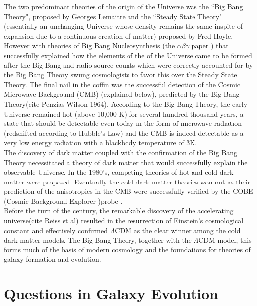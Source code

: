 The two predominant theories of the origin of the Universe was the ``Big Bang Theory", proposed by Georges Lemaitre and the ``Steady State Theory"(essentially an unchanging Universe whose density remains the same inspite of expansion due to a continuous creation of matter) proposed by Fred Hoyle. However with theories of Big Bang Nucleosynthesis (the $\alpha\beta\gamma$ paper \citep{alpher_origin_1948}) that successfully explained how the elements of the of the Universe came to be formed after the Big Bang and radio source counts which were correctly accounted for by the Big Bang Theory swung cosmologists to favor this over the Steady State Theory. The final nail in the coffin was the successful detection of the Cosmic Microwave Background (CMB) (explained below), predicted by the Big Bang Theory(cite Penzias Wilson 1964). According to the Big Bang Theory, the early Universe remained hot (above 10,000 K) for several hundred thousand years, a state that should be detectable even today in the form of microwave radiation (redshifted according to Hubble's Law) and the CMB is indeed detectable as a very low energy radiation with a blackbody temperature of \~ 3K.\\

The discovery of dark matter coupled with the confirmation of the Big Bang Theory necessitated a theory of dark matter that would successfully explain the observable Universe. In the 1980's, competing theories of hot and cold dark matter \citep{1985ApJ...292..371D} were proposed. Eventually the cold dark matter theories won out as their prediction of the anisotropies in the CMB \citep{peebles_large-scale_1982} were successfully verified by the COBE (Cosmic Background Explorer )probe \citep{riess_observational_1998}.\\

Before the turn of the century, the remarkable discovery of the accelerating universe(cite Reiss et al) resulted in the resurrection of Einstein's cosmological constant and effectively confirmed $\Lambda$CDM as the clear winner among the cold dark matter models. The Big Bang Theory, together with the $\Lambda$CDM model, this forms much of the basis of modern cosmology and the foundations for theories of galaxy formation and evolution.\\

\section{Questions in Galaxy Evolution}


